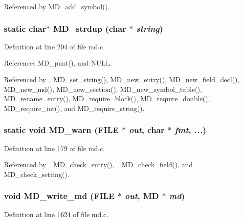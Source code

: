 Referenced by MD\_\-add\_\-symbol().
\subsubsection{\setlength{\rightskip}{0pt plus 5cm}static char$\ast$ MD\_\-strdup (char $\ast$ {\em string})\hspace{0.3cm}{\tt  [static]}}\label{md_8c_2a2b2c7d0a9edb776479289b81b485a7}




Definition at line 204 of file md.c.

References MD\_\-punt(), and NULL.

Referenced by \_\-MD\_\-set\_\-string(), MD\_\-new\_\-entry(), MD\_\-new\_\-field\_\-decl(), MD\_\-new\_\-md(), MD\_\-new\_\-section(), MD\_\-new\_\-symbol\_\-table(), MD\_\-rename\_\-entry(), MD\_\-require\_\-block(), MD\_\-require\_\-double(), MD\_\-require\_\-int(), and MD\_\-require\_\-string().
\subsubsection{\setlength{\rightskip}{0pt plus 5cm}static void MD\_\-warn (FILE $\ast$ {\em out}, char $\ast$ {\em fmt},  {\em ...})\hspace{0.3cm}{\tt  [static]}}\label{md_8c_e513b7812f975befb0b540741a237cda}




Definition at line 179 of file md.c.

Referenced by \_\-MD\_\-check\_\-entry(), \_\-MD\_\-check\_\-field(), and MD\_\-check\_\-setting().
\subsubsection{\setlength{\rightskip}{0pt plus 5cm}void MD\_\-write\_\-md (FILE $\ast$ {\em out}, \bf{MD} $\ast$ {\em md})}\label{md_8c_08198a382f6e7b587c2a239dcb3af660}




Definition at line 1624 of file md.c.


